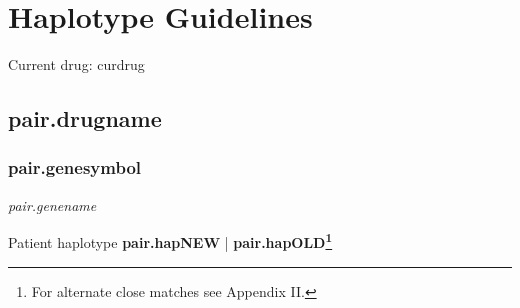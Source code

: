 \documentclass{book}
\begin{document}
\normalsize

\newpage


\section{Haplotype Guidelines}

{%

  {%

    {%

      {%

    {%

      Current drug: {{ curdrug }}

      {%

        \subsection{ {{pair.drugname}} }
        {%

      {%

      \subsubsection{ {{pair.genesymbol}} }
      \textit{ {{pair.genename}} }
      \begin{center}
      Patient haplotype
      \textbf{ {{pair.hapNEW}} } | \textbf{ {{pair.hapOLD}}\footnote{For alternate close matches see Appendix II.} } \newline\newline
      \scriptsize
      \end{center}

  {%

{%

\newpage
\normalsize


}}}}}}}}}}
\end{document}
